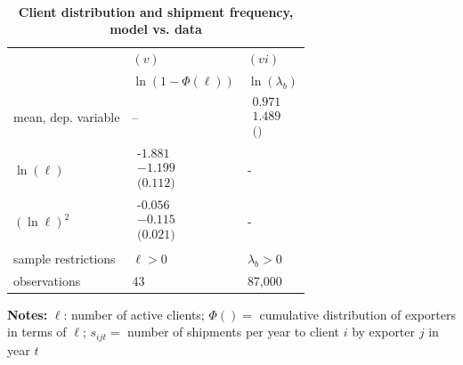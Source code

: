 \documentclass[12pt]{article}
\begin{document}
\begin{table}[tbp]
\caption{\textbf{Client distribution and shipment frequency, model vs. data}}
\label{tab:client_dist_model_data}\centering
{\small \ }
\par
{\small 
\begin{tabular}{lll}
\hline\hline
& $(v)$ & $(vi)$ \\ 
& $\ln (1-\Phi (\ell ))$ & $\ln (\lambda _{b})$ \\ \hline
mean, dep. variable & -- & $%
\begin{array}{c}
\text{0.971} \\ 
1.489 \\ 
\text{()}%
\end{array}%
$ \\ \cline{2-3}
$\ln (\ell )$ & $%
\begin{array}{c}
\text{-1.881} \\ 
-1.199 \\ 
\text{(0.112)}%
\end{array}%
$ & - \\ \cline{2-3}
$(\ln \ell )^{2}$ & $%
\begin{array}{c}
\text{-0.056} \\ 
-0.115 \\ 
\text{(0.021)}%
\end{array}%
$ & - \\ \hline
sample restrictions & $\ell >0$ & $\lambda _{b}>0$ \\ 
observations & 43 & 87,000 \\ \hline
\end{tabular}
} \endcenter%
\begin{tablenotes}
\item \textbf{Notes:} $\ell$: number of active clients;  $\Phi ( ) = $ cumulative distribution of exporters in terms of  $\ell$;
$s_{ijt}=$ number of shipments per year to client $i$ by exporter $j$ in year $t$
\end{tablenotes}
\end{table}
\end{document}
